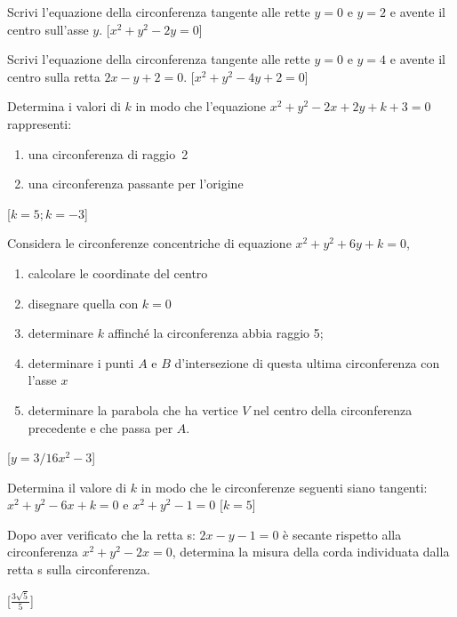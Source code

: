 \begin{esercizio}\label{ese:}
Scrivi l’equazione della circonferenza tangente alle rette 
\(y=0\) e \(y=2\) e avente il centro sull’asse \(y\).
\hfill[\(x^2+y^2-2y=0\)]
\end{esercizio}

\begin{esercizio}\label{ese:}
Scrivi l’equazione della circonferenza tangente alle rette 
\(y=0\) e \(y=4\) e 
avente il centro sulla retta \(2x-y+2=0\).
\hfill[\(x^2+y^2-4y+2=0\)]
\end{esercizio}

\begin{esercizio}\label{ese:}
Determina i valori di \(k\) in modo che l’equazione \(x^2+y^2-2x+2y+k+3=0\) 
rappresenti:
\begin{enumerate} [label=\alph*), nosep]
\item una circonferenza di raggio~2
\item una circonferenza passante per l’origine
\end{enumerate}
\hfill[\(k=5; k=-3\)]
\end{esercizio}

\begin{esercizio}\label{ese:}
    Considera le circonferenze concentriche di equazione 
\(x^2+y^2+6y+k=0\),
\begin{enumerate} [label=\alph*), nosep]
\item calcolare le coordinate del centro 
\item disegnare quella con \(k=0\) 
\item determinare \(k\) affinché la circonferenza abbia raggio 5; 
\item determinare i punti \(A\) e \(B\) d’intersezione di questa ultima 
circonferenza con l’asse \(x\) 
\item determinare la parabola che ha vertice \(V\) nel centro della 
circonferenza precedente e che passa per \(A\).
\end{enumerate}
\hfill[\(y=3/16x^2-3\)]
\end{esercizio}

\begin{esercizio}\label{ese:}
Determina il valore di \(k\) in modo che le circonferenze seguenti 
siano tangenti:\\
\(x^2+y^2-6x+k=0\) e \(x^2+y^2-1=0\)
\hfill[\(k=5\)]

\end{esercizio}

\begin{esercizio}\label{ese:}
Dopo aver verificato che la retta s: \(2x-y-1=0\) è secante rispetto alla 
circonferenza \(x^2+y^2-2x=0\), determina la misura della corda individuata 
dalla retta s sulla circonferenza.

\hfill[\(\frac{3 \sqrt{5}}{5}\)]
\end{esercizio}

